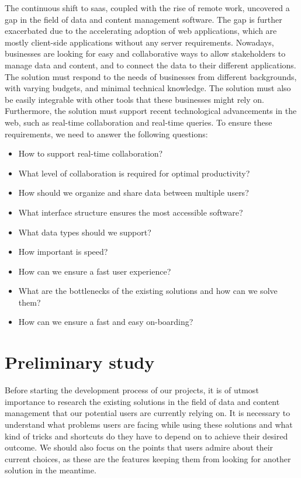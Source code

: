 The continuous shift to \acrfull{saas}, coupled with the rise of remote work, uncovered a gap in the field of data and content management software. The gap is further exacerbated due to the accelerating adoption of web applications, which are mostly client-side applications without any server requirements. Nowadays, businesses are looking for easy and collaborative ways to allow stakeholders to manage data and content, and to connect the data to their different applications. The solution must respond to the needs of businesses from different backgrounds, with varying budgets, and minimal technical knowledge. The solution must also be easily integrable with other tools that these businesses might rely on. Furthermore, the solution must support recent technological advancements in the web, such as real-time collaboration and real-time queries. To ensure these requirements, we need to answer the following questions:

\begin{itemize}
	\item How to support real-time collaboration?
	\item What level of collaboration is required for optimal productivity?
	\item How should we organize and share data between multiple users?
	\item What interface structure ensures the most accessible software?
	\item What data types should we support?
	\item How important is speed?
	\item How can we ensure a fast user experience?
	\item What are the bottlenecks of the existing solutions and how can we solve them?
	\item How can we ensure a fast and easy on-boarding?
\end{itemize}

\section{Preliminary study}

Before starting the development process of our projects, it is of utmost importance to research the existing solutions in the field of data and content management that our potential users are currently relying on.
It is necessary to understand what problems users are facing while using these solutions and what kind of tricks and shortcuts do they have to depend on to achieve their desired outcome. We should also focus on the points that users admire about their current choices, as these are the features keeping them from looking for another solution in the meantime.

